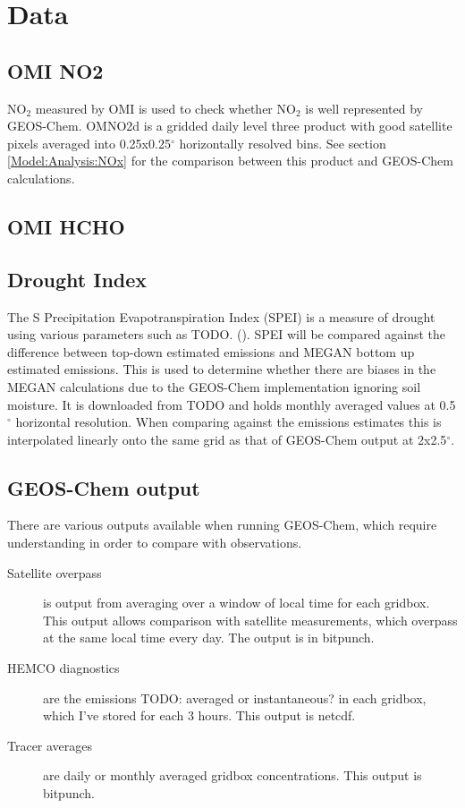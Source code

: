 \section{Data}
  \label{BioIsop:Data}  
  
  \subsection{OMI NO2}
    NO$_2$ measured by OMI is used to check whether NO$_2$ is well represented by GEOS-Chem. 
    OMNO2d is a gridded daily level three product with good satellite pixels averaged into 0.25x0.25$^{\circ}$ horizontally resolved bins.
    See section \ref{Model:Analysis:NOx} for the comparison between this product and GEOS-Chem calculations.
  
  \subsection{OMI HCHO}
  
  \subsection{Drought Index}
    The S Precipitation Evapotranspiration Index (SPEI) is a measure of drought using various parameters such as TODO. (\cite{Wang2017}).
    SPEI will be compared against the difference between top-down estimated emissions and MEGAN bottom up estimated emissions. 
    This is used to determine whether there are biases in the MEGAN calculations due to the GEOS-Chem implementation ignoring soil moisture.
    It is downloaded from TODO and holds monthly averaged values at 0.5$^{\circ}$ horizontal resolution.
    When comparing against the emissions estimates this is interpolated linearly onto the same grid as that of GEOS-Chem output at 2x2.5$^{\circ}$.
  
  \subsection{GEOS-Chem output}
    There are various outputs available when running GEOS-Chem, which require understanding in order to compare with observations.
    \begin{description}
      \item[Satellite overpass] is output from averaging over a window of local time for each gridbox. 
        This output allows comparison with satellite measurements, which overpass at the same local time every day.
        The output is in bitpunch.
      \item[HEMCO diagnostics] are the emissions TODO: averaged or instantaneous? in each gridbox, which I've stored for each 3 hours.
        This output is netcdf.
      \item[Tracer averages] are daily or monthly averaged gridbox concentrations.
        This output is bitpunch.
        
    \end{description}
  
